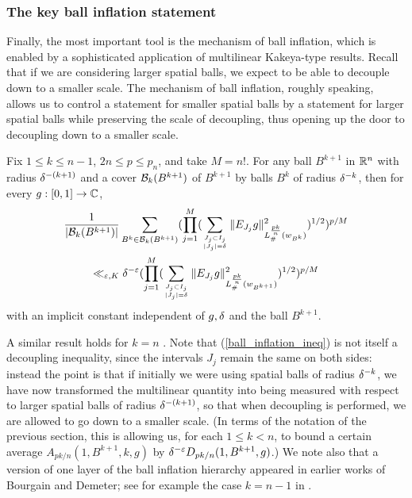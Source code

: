 \documentclass[brochure,english,12pt]{bourbaki}%
\newcommand{\C}{\mathbb{C}}
\begin{document}
\subsubsection{The key ball inflation statement}
Finally, the most important tool is the mechanism of ball inflation, which is enabled by a sophisticated application of multilinear Kakeya-type results. Recall that if we are considering larger spatial balls, we expect to be able to decouple down to a smaller scale.  The mechanism of ball inflation, roughly speaking, allows us to control a statement for smaller spatial balls by a statement for larger spatial balls while preserving the scale of decoupling, thus opening up the door to decoupling down to a smaller scale. 
\begin{prop}\label{prop_ball_inflation}
Fix $ 1 \leq k \leq n-1$, $2n \leq p \leq p_n$, and take $M=n!$. For any ball $B^{k+1}$ in $\mathbb{R}^n$ with radius $\delta^{-(k+1)}$ and a cover $\mathcal{B}_k(B^{k+1})$ of $B^{k+1}$ by balls $B^k$ of radius $\delta^{-k}$, then for every $g:[0,1] \maps \C$, 
\begin{multline}\label{ball_inflation_ineq}
\frac{1}{|\mathcal{B}_k(B^{k+1})|} \sum_{B^k \in \mathcal{B}_k(B^{k+1})} ( \prod_{j=1}^M (\sum_{J_j \subset I_j \atop |J_j| = \delta} \|E_{J_j} g\|_{L^{\frac{pk}{n}}_\#(w_{B^k})}^2 )^{1/2} )^{p/M}
\\
\ll_{\varepsilon,K} \delta^{-\varepsilon} ( \prod_{j=1}^M (\sum_{J_j \subset I_j \atop |J_j| = \delta} \|E_{J_j} g\|_{L^{\frac{pk}{n}}_\#(w_{B^{k+1}})}^2 )^{1/2} )^{p/M}
\end{multline}
with an implicit constant independent of $g,\delta$ and the ball $B^{k+1}$.
\end{prop}
A similar result holds for $k=n$ \cite[Eqn. 17]{BDG16}.
Note that (\ref{ball_inflation_ineq}) is not itself a decoupling inequality, since the intervals $J_j$ remain the same on both sides:  instead the point is that if initially we were using spatial balls of radius $\delta^{-k}$, we have now transformed the multilinear quantity into being measured with respect to larger spatial balls of radius $\delta^{-(k+1)}$, so that when decoupling is performed, we are allowed to go down to a smaller scale. 
(In terms of the notation of the previous section, this is allowing us, for each $1 \leq k <n$, to bound a certain average $A_{pk/n}(1, B^{k+1},k,g)$ by $\delta^{-\varepsilon} D_{pk/n}(1,B^{k+1},g)$.) 
We note also that a version of one layer of the ball inflation hierarchy appeared in earlier works of Bourgain and Demeter; see for example the case $k=n-1$ in \cite[Thm. 9.2]{BouDem17a}.
\end{document}
